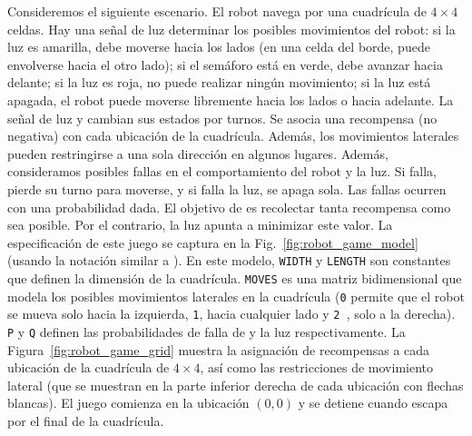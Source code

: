 Consideremos el siguiente escenario. El robot \roborta navega por una cuadrícula de $4 \times 4$ celdas. Hay una señal de luz
determinar los posibles movimientos del robot: si la luz es amarilla, debe moverse hacia los lados (en una celda del borde, \roborta puede envolverse hacia el otro lado); si el semáforo está en verde, debe avanzar hacia delante; si la luz es roja, no puede realizar ningún movimiento; si la luz está apagada, el robot puede moverse libremente hacia los lados o hacia adelante. La señal de luz y \roborta cambian sus estados por turnos. Se asocia una recompensa (no negativa) con cada ubicación de la cuadrícula. Además, los movimientos laterales pueden restringirse a una sola dirección en algunos lugares.
Además, consideramos posibles fallas en el comportamiento del robot y la luz. Si \roborta falla, pierde su turno para moverse, y si falla la luz, se apaga sola. Las fallas ocurren con una probabilidad dada. El objetivo de \roborta es recolectar tanta recompensa como sea posible. Por el contrario, la luz apunta a minimizar este valor.
La especificación de este juego se captura en la Fig.~\ref{fig:robot_game_model} (usando la notación similar a {\Prism} \cite{DBLP:conf/cav/KwiatkowskaNP11}).
En este modelo, \texttt{WIDTH} y \texttt{LENGTH} son constantes que definen la dimensión de la cuadrícula. \texttt{MOVES} es una matriz bidimensional que modela los posibles movimientos laterales en la cuadrícula (\texttt{0} permite que el robot se mueva solo hacia la izquierda, \texttt{1}, hacia cualquier lado y \texttt{2 }, solo a la derecha). \texttt{P} y \texttt{Q} definen las probabilidades de falla de \roborta y la luz respectivamente.
La Figura~\ref{fig:robot_game_grid} muestra la asignación de recompensas a cada ubicación de la cuadrícula de $4 \times 4$, así como las restricciones de movimiento lateral (que se muestran en la parte inferior derecha de cada ubicación con flechas blancas).
El juego comienza en la ubicación $(0, 0)$ y se detiene cuando \roborta escapa por el final de la cuadrícula.



